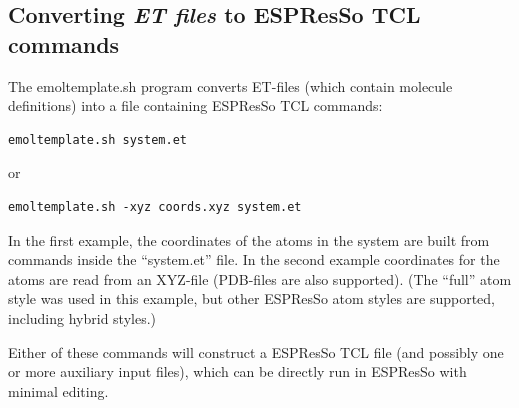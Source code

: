 \documentclass[11pt]{article}
\begin{document}
\subsection{Converting \textit{ET files} to ESPResSo TCL commands}
The emoltemplate.sh program converts ET-files (which contain 
molecule definitions) into a file containing ESPResSo TCL commands:
\begin{verbatim}
emoltemplate.sh system.et
\end{verbatim}
     or
\begin{verbatim}
emoltemplate.sh -xyz coords.xyz system.et
\end{verbatim}
In the first example, the coordinates of the atoms in the 
system are built from commands inside the ``system.et'' file.
In the second example coordinates for the atoms are 
read from an XYZ-file (PDB-files are also supported).
(The ``full'' atom style was used in this example, but other
 ESPResSo atom styles are supported, including hybrid styles.)

Either of these commands will construct a ESPResSo TCL file 
(and possibly one or more auxiliary input files),
which can be directly run in ESPResSo with minimal editing.



%
\end{document}
